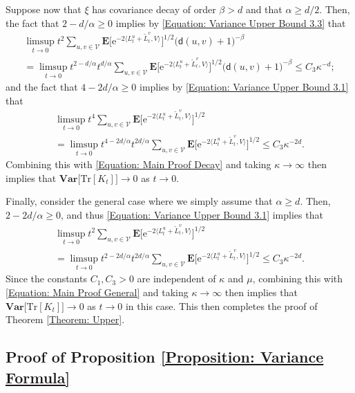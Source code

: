 \documentclass{amsart}
\numberwithin{equation}{section}
\theoremstyle{definition}
\newcommand\al{\alpha}
\newcommand\be{\beta}
\newcommand\ka{\kappa}
\newcommand\mbf{\mathbf}
\newcommand\mr{\mathrm}
\newcommand\ms{\mathscr}
\newcommand\msf{\mathsf}
\begin{document}
%

Suppose now that $\xi$ has covariance decay of order $\be>d$ and that $\al\geq d/2$.
Then, the fact that $2-d/\al\geq0$ implies by \eqref{Equation: Variance Upper Bound 3.3} that
\begin{multline*}
\limsup_{t\to0}t^2\sum_{u,v\in\ms V}\mbf E\Big[\mr e^{-2\langle L^u_t+\tilde L^v_t,V\rangle}\Big]^{1/2}\big(\msf d(u,v)+1\big)^{-\be}\\
=\limsup_{t\to0}t^{2-d/\al}t^{d/\al}\sum_{u,v\in\ms V}\mbf E\Big[\mr e^{-2\langle L^u_t+\tilde L^v_t,V\rangle}\Big]^{1/2}\big(\msf d(u,v)+1\big)^{-\be}
\leq C_3\ka^{-d};
\end{multline*}
and the fact that $4-2d/\al\geq0$ implies by \eqref{Equation: Variance Upper Bound 3.1} that
\begin{multline*}
\limsup_{t\to0}t^4\sum_{u,v\in\ms V}\mbf E\Big[\mr e^{-2\langle L^u_t+\tilde L^v_t,V\rangle}\Big]^{1/2}\\
=\limsup_{t\to0}t^{4-2d/\al}t^{2d/\al}\sum_{u,v\in\ms V}\mbf E\Big[\mr e^{-2\langle L^u_t+\tilde L^v_t,V\rangle}\Big]^{1/2}
\leq C_3\ka^{-2d}.
\end{multline*}
Combining this with \eqref{Equation: Main Proof Decay} and taking $\ka\to\infty$ then implies that
$\mbf{Var}\big[\mr{Tr}[K_t]\big]\to0$ as $t\to0$.

%

Finally, consider the general case where we simply assume that $\al\geq d$.
Then, $2-2d/\al\geq0$, and thus \eqref{Equation: Variance Upper Bound 3.1} implies that
\begin{multline*}
\limsup_{t\to0} t^2\sum_{u,v\in\ms V}\mbf E\Big[\mr e^{-2\langle L^u_t+\tilde L^v_t,V\rangle}\Big]^{1/2}\\
=\limsup_{t\to0} t^{2-2d/\al}t^{2d/\al}\sum_{u,v\in\ms V}\mbf E\Big[\mr e^{-2\langle L^u_t+\tilde L^v_t,V\rangle}\Big]^{1/2}\leq C_3\ka^{-2d}.
\end{multline*}
Since the constants $C_1,C_3>0$ are independent of $\ka$ and $\mu$, combining this with \eqref{Equation: Main Proof General}
and taking $\ka\to\infty$ then implies that $\mbf{Var}\big[\mr{Tr}[K_t]\big]\to0$ as $t\to0$ in this case.
This then completes the proof of Theorem \ref{Theorem: Upper}.

%

\subsection{Proof of Proposition \ref{Proposition: Variance Formula}}
\label{Section: Proof of Variance Formula}
\end{document}
